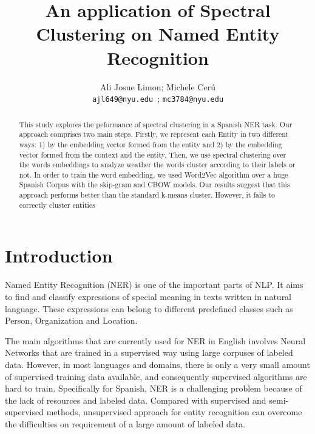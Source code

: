 \documentclass[]{article}
\title{An application of Spectral Clustering on Named Entity Recognition}
\author{Ali Josue Limon; Michele Cer\'u \\ 
	\texttt{ajl649@nyu.edu }; \texttt{mc3784@nyu.edu}
}
\begin{document}
	\maketitle
	\newcommand{\slugmaster}{%
		\slugger{siads}{xxxx}{xx}{x}{x---x}}%
	
	
	
	\begin{abstract}
		This study explores the peformance of spectral clustering in a Spanish NER task. Our approach comprises two main steps. Firstly, we represent each Entity in two different ways: 1) by the embedding vector formed from the entity and 2) by the embedding vector formed from the context and the entity.  Then, we use spectral clustering over the words embeddings  to analyze weather the words cluster according to their labels or not.  In order to train the word embedding, we used Word2Vec algorithm over a huge Spanish Corpus with the skip-gram and CBOW models. Our results suggest that this approach performs better than the standard k-means cluster. However, it fails to correctly cluster entities 
		
		
	\end{abstract}
	
	\section{Introduction}
	
	Named Entity Recognition (NER) is one of the important parts of NLP. It aims to find and classify expressions of special meaning in texts written in natural language.  These expressions can belong to different predefined classes such as Person, Organization and Location. 
	
	The main algorithms that are currently used for NER in English involves Neural Networks that are trained in a supervised way using large corpuses of labeled data. However, in most languages and domains, there is only a very small amount of supervised training data available, and consequently supervised algorithms are hard to train. Specifically for Spanish, NER is a challenging problem because of the lack of resources and labeled data. Compared with supervised and semi-supervised methods, unsupervised approach for entity recognition can overcome the difficulties on requirement of a large amount of labeled data. 
	
\end{document}
